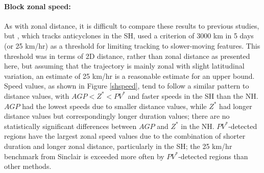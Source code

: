 \documentclass[smallextended]{svjour3}       %
\numberwithin{equation}{section}
\begin{document}
\paragraph{Block zonal speed:} As with zonal distance, it is difficult to compare these results to previous studies, but \cite{sinclair_climatology_1996}, which tracks anticyclones in the SH, used a criterion of 3000 km in 5 days (or 25 km/hr) as a threshold for limiting tracking to slower-moving features. This threshold was in terms of 2D distance, rather than zonal distance as presented here, but assuming that the trajectory is mainly zonal with slight latitudinal variation, an estimate of 25 km/hr is a reasonable estimate for an upper bound. 
{\color{blue}
Speed values, as shown in Figure \ref{shspeed}, tend to follow a similar pattern to distance values, with $AGP<Z^*<PV^*$ and faster speeds in the SH than the NH. $AGP$ had the lowest speeds due to smaller distance values, while $Z^*$ had longer distance values but correspondingly longer duration values; there are no statistically significant differences between $AGP$ and $Z^*$ in the NH. $PV^*$-detected regions have the largest zonal speed values due to the combination of shorter duration and longer zonal distance, particularly in the SH; the 25 km/hr benchmark from Sinclair is exceeded more often by $PV^*$-detected regions than other methods.}


\end{document}
